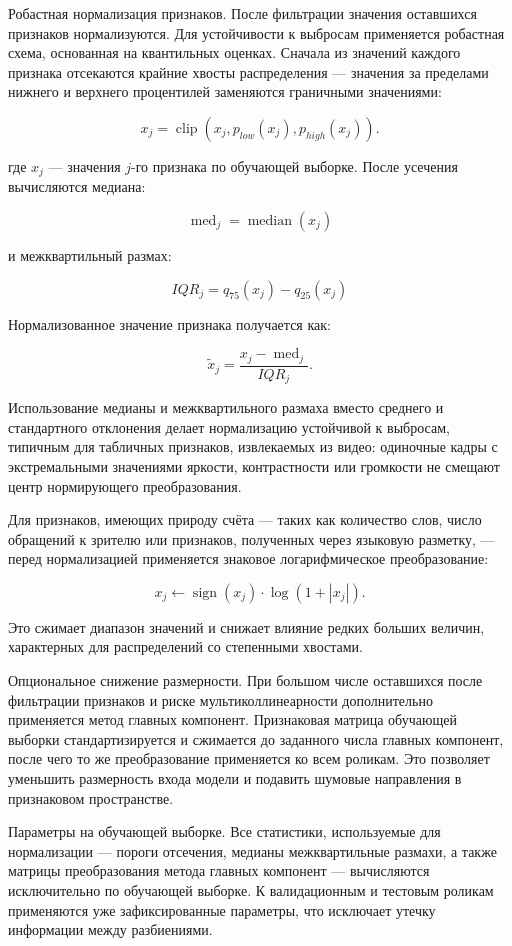 \documentclass[times]{itmo-student-thesis}
\begin{document}
Робастная нормализация признаков. После фильтрации значения оставшихся признаков нормализуются. Для устойчивости к выбросам применяется робастная схема, основанная на квантильных оценках. Сначала из значений каждого признака отсекаются крайние хвосты распределения — значения за пределами нижнего и верхнего процентилей заменяются граничными значениями:

\[
x_j=\operatorname{clip}(x_j,p_{low}(x_j),p_{high}(x_j)).
\]

где $x_j$ — значения $j$-го признака по обучающей выборке. После усечения вычисляются медиана:

\[
\operatorname{med}_j=\operatorname{median}(x_j)
\]

и межквартильный размах:

\[
IQR_j=q_{75}(x_j)-q_{25}(x_j)
\]

Нормализованное значение признака получается как:

\[
\tilde{x}_j=\frac{x_j-\operatorname{med}_j}{IQR_j}.
\]

Использование медианы и межквартильного размаха вместо среднего и стандартного отклонения делает нормализацию устойчивой к выбросам, типичным для табличных признаков, извлекаемых из видео: одиночные кадры с экстремальными значениями яркости, контрастности или громкости не смещают центр нормирующего преобразования.

Для признаков, имеющих природу счёта — таких как количество слов, число обращений к зрителю или признаков, полученных через языковую разметку, — перед нормализацией применяется знаковое логарифмическое преобразование:

\[
x_j\leftarrow \operatorname{sign}(x_j)\cdot\log(1+|x_j|).
\]

Это сжимает диапазон значений и снижает влияние редких больших величин, характерных для распределений со степенными хвостами.

Опциональное снижение размерности. При большом числе оставшихся после фильтрации признаков и риске мультиколлинеарности дополнительно применяется метод главных компонент. Признаковая матрица обучающей выборки стандартизируется и сжимается до заданного числа главных компонент, после чего то же преобразование применяется ко всем роликам. Это позволяет уменьшить размерность входа модели и подавить шумовые направления в признаковом пространстве.

Параметры на обучающей выборке. Все статистики, используемые для нормализации — пороги отсечения, медианы межквартильные размахи, а также матрицы преобразования метода главных компонент — вычисляются исключительно по обучающей выборке. К валидационным и тестовым роликам применяются уже зафиксированные параметры, что исключает утечку информации между разбиениями.
\end{document}
